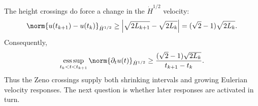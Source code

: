 The height crossings do force a change in the \(\dot H^{1/2}\) velocity:
\[
  \norm{u(t_{k+1})-u(t_k)}_{\dot H^{1/2}}
  \geq
  \left|\sqrt{2L_{k+1}}-\sqrt{2L_k}\right|
  =(\sqrt2-1)\sqrt{2L_k}.
\]
Consequently,
\[
  \operatorname*{ess\,sup}_{t_k<t<t_{k+1}}
  \norm{\partial_tu(t)}_{\dot H^{1/2}}
  \geq
  \frac{(\sqrt2-1)\sqrt{2L_k}}{t_{k+1}-t_k}.
\]
Thus the Zeno crossings supply both shrinking intervals and growing Eulerian velocity responses.
The next question is whether later responses are activated in turn.
